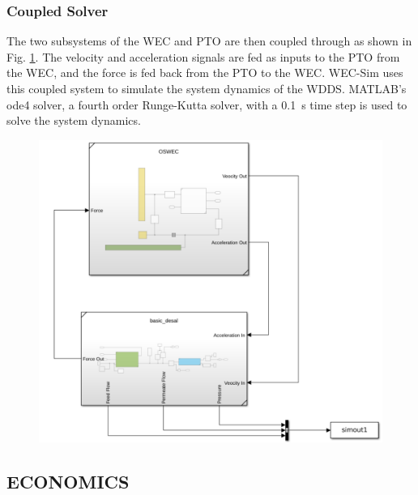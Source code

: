 \documentclass[twocolumn,10pt]{asme2e}
\begin{document}
\subsubsection{Coupled Solver}

The two subsystems of the WEC and PTO are then coupled through as shown in Fig. \ref{fig:coupled_system}. The velocity and acceleration signals are fed as inputs to the PTO from the WEC, and the force is fed back from the PTO to the WEC. WEC-Sim uses this coupled system to simulate the system dynamics of the WDDS. MATLAB's ode4 solver, a fourth order Runge-Kutta solver, with a 0.1~s time step is used to solve the system dynamics. 

\begin{figure}
    \includegraphics[width=0.8\linewidth]{../figs/coupledsimscape.pdf}
    \label{fig:coupled_system}
\end{figure}

\subsection{ECONOMICS} \label{sec:econ}
\end{document}
